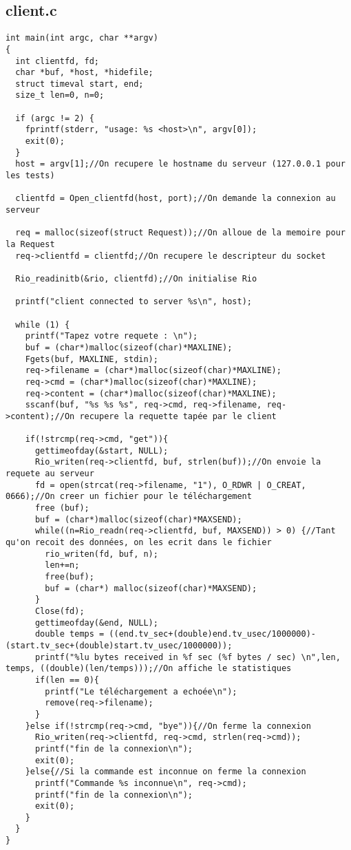 \documentclass{report}
\begin{document}
      \subsection{client.c}
      \begin{lstlisting}
int main(int argc, char **argv)
{
  int clientfd, fd;
  char *buf, *host, *hidefile;
  struct timeval start, end;
  size_t len=0, n=0;

  if (argc != 2) {
    fprintf(stderr, "usage: %s <host>\n", argv[0]);
    exit(0);
  }
  host = argv[1];//On recupere le hostname du serveur (127.0.0.1 pour les tests)

  clientfd = Open_clientfd(host, port);//On demande la connexion au serveur

  req = malloc(sizeof(struct Request));//On alloue de la memoire pour la Request
  req->clientfd = clientfd;//On recupere le descripteur du socket

  Rio_readinitb(&rio, clientfd);//On initialise Rio

  printf("client connected to server %s\n", host);

  while (1) {
    printf("Tapez votre requete : \n");
    buf = (char*)malloc(sizeof(char)*MAXLINE);
    Fgets(buf, MAXLINE, stdin);
    req->filename = (char*)malloc(sizeof(char)*MAXLINE);
    req->cmd = (char*)malloc(sizeof(char)*MAXLINE);
    req->content = (char*)malloc(sizeof(char)*MAXLINE);
    sscanf(buf, "%s %s %s", req->cmd, req->filename, req->content);//On recupere la requette tapée par le client

    if(!strcmp(req->cmd, "get")){
      gettimeofday(&start, NULL);
      Rio_writen(req->clientfd, buf, strlen(buf));//On envoie la requete au serveur
      fd = open(strcat(req->filename, "1"), O_RDWR | O_CREAT, 0666);//On creer un fichier pour le téléchargement
      free (buf);
      buf = (char*)malloc(sizeof(char)*MAXSEND);
      while((n=Rio_readn(req->clientfd, buf, MAXSEND)) > 0) {//Tant qu'on recoit des données, on les ecrit dans le fichier
        rio_writen(fd, buf, n);
        len+=n;
        free(buf);
        buf = (char*) malloc(sizeof(char)*MAXSEND);
      }
      Close(fd);
      gettimeofday(&end, NULL);
      double temps = ((end.tv_sec+(double)end.tv_usec/1000000)-(start.tv_sec+(double)start.tv_usec/1000000));
      printf("%lu bytes received in %f sec (%f bytes / sec) \n",len, temps, ((double)(len/temps)));//On affiche le statistiques
      if(len == 0){
        printf("Le téléchargement a echoée\n");
        remove(req->filename);
      }
    }else if(!strcmp(req->cmd, "bye")){//On ferme la connexion
      Rio_writen(req->clientfd, req->cmd, strlen(req->cmd));
      printf("fin de la connexion\n");
      exit(0);
    }else{//Si la commande est inconnue on ferme la connexion
      printf("Commande %s inconnue\n", req->cmd);
      printf("fin de la connexion\n");
      exit(0);
    }
  }
}
      \end{lstlisting}
\end{document}

